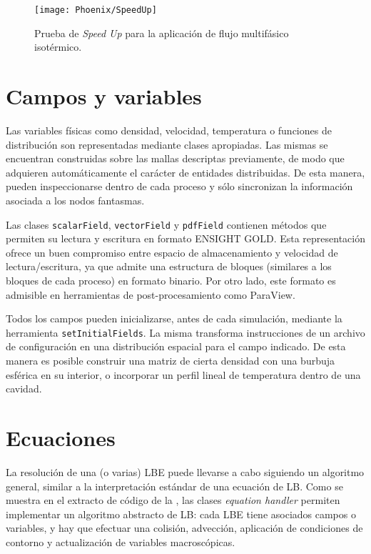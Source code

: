 \begin{figure}[ht]
	\centering
	\texttt{[image: Phoenix/SpeedUp]}
	\caption{Prueba de \emph{Speed Up} para la aplicaci\'on de flujo multif\'asico isot\'ermico.}
	\label{fig:speedup_cpu}
\end{figure}




\section{Campos y variables}

Las variables f\'isicas como densidad, velocidad, temperatura o funciones de distribuci\'on son representadas mediante clases apropiadas. Las mismas se encuentran construidas sobre las mallas descriptas previamente, de modo que adquieren autom\'aticamente el car\'acter de entidades distribuidas. De esta manera, pueden inspeccionarse dentro de cada proceso y s\'olo sincronizan la informaci\'on asociada a los nodos fantasmas.

Las clases \texttt{scalarField}, \texttt{vectorField} y \texttt{pdfField} contienen m\'etodos que permiten su lectura y escritura en formato ENSIGHT GOLD. Esta representaci\'on ofrece un buen compromiso entre espacio de almacenamiento y velocidad de lectura/escritura, ya que admite una estructura de bloques (similares a los bloques de cada proceso) en formato binario. Por otro lado, este formato es admisible en herramientas de post-procesamiento como ParaView.

Todos los campos pueden inicializarse, antes de cada simulaci\'on, mediante la herramienta \texttt{setInitialFields}. La misma transforma instrucciones de un archivo de configuraci\'on en una distribuci\'on espacial para el campo indicado. De esta manera es posible construir una matriz de cierta densidad con una burbuja esf\'erica en su interior, o incorporar un perfil lineal de temperatura dentro de una cavidad.



\section{Ecuaciones}

La resoluci\'on de una (o varias) LBE puede llevarse a cabo siguiendo un algoritmo general, similar a la interpretaci\'on est\'andar de una ecuaci\'on de LB. Como se muestra en el extracto de c\'odigo de la , las clases \emph{equation handler} permiten implementar un algoritmo abstracto de LB: cada LBE tiene asociados campos o variables, y hay que efectuar una colisi\'on, advecci\'on, aplicaci\'on de condiciones de contorno y actualizaci\'on de variables macrosc\'opicas.

